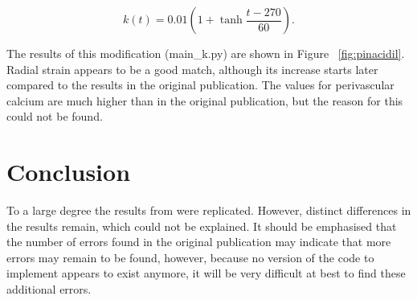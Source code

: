 \documentclass[10pt,a4paper,onecolumn]{article}
\begin{document}
\[k(t) = 0.01 \left( 1 + \tanh \frac{t-270}{60} \right).\]

The results of this modification (main\_k.py) are shown in Figure
~\ref{fig:pinacidil}. Radial strain appears to be a good match, although
its increase starts later compared to the results in the original
publication. The values for perivascular calcium are much higher than in
the original publication, but the reason for this could not be found.

\section{Conclusion}\label{conclusion}

To a large degree the results from \autocite{Witthoft2012} were
replicated. However, distinct differences in the results remain, which
could not be explained. It should be emphasised that the number of
errors found in the original publication may indicate that more errors
may remain to be found, however, because no version of the code to
implement \autocite{Witthoft2012} appears to exist anymore, it will be
very difficult at best to find these additional errors.

{\sffamily \small
  \printbibliography[title=References]
}
\end{document}
